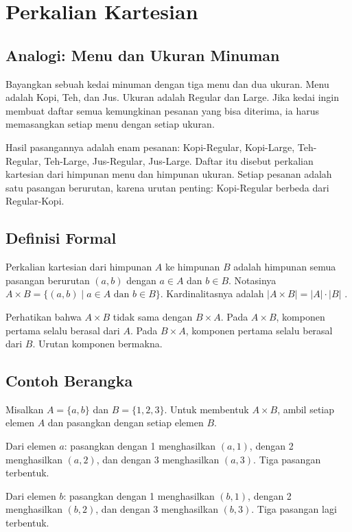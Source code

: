 \documentclass[11pt,a4paper]{article}
\begin{document}
\section{Perkalian Kartesian}

\subsection{Analogi: Menu dan Ukuran Minuman}

Bayangkan sebuah kedai minuman dengan tiga menu dan dua ukuran. Menu adalah Kopi, Teh, dan Jus. Ukuran adalah Regular dan Large. Jika kedai ingin membuat daftar semua kemungkinan pesanan yang bisa diterima, ia harus memasangkan setiap menu dengan setiap ukuran.

Hasil pasangannya adalah enam pesanan: Kopi-Regular, Kopi-Large, Teh-Regular, Teh-Large, Jus-Regular, Jus-Large. Daftar itu disebut perkalian kartesian dari himpunan menu dan himpunan ukuran. Setiap pesanan adalah satu pasangan berurutan, karena urutan penting: Kopi-Regular berbeda dari Regular-Kopi.

\subsection{Definisi Formal}

Perkalian kartesian dari himpunan $A$ ke himpunan $B$ adalah himpunan semua pasangan berurutan $(a,b)$ dengan $a \in A$ dan $b \in B$. Notasinya $A \times B=\{(a,b) \mid a \in A \text{ dan } b \in B\}$. Kardinalitasnya adalah $|A \times B|=|A| \cdot |B|$ \cite{rosen}.

Perhatikan bahwa $A \times B$ tidak sama dengan $B \times A$. Pada $A \times B$, komponen pertama selalu berasal dari $A$. Pada $B \times A$, komponen pertama selalu berasal dari $B$. Urutan komponen bermakna.

\subsection{Contoh Berangka}

Misalkan $A=\{a,b\}$ dan $B=\{1,2,3\}$. Untuk membentuk $A \times B$, ambil setiap elemen $A$ dan pasangkan dengan setiap elemen $B$.

Dari elemen $a$: pasangkan dengan 1 menghasilkan $(a,1)$, dengan 2 menghasilkan $(a,2)$, dan dengan 3 menghasilkan $(a,3)$. Tiga pasangan terbentuk.

Dari elemen $b$: pasangkan dengan 1 menghasilkan $(b,1)$, dengan 2 menghasilkan $(b,2)$, dan dengan 3 menghasilkan $(b,3)$. Tiga pasangan lagi terbentuk.
\end{document}
